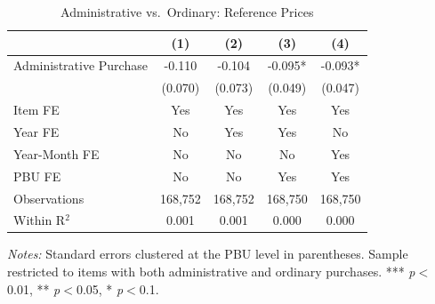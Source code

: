 \begin{table}[ht]
  \centering
  \caption{Administrative vs.\ Ordinary: Reference Prices}
  \label{tab:v8_adm_ref_prices}
  \small
  \begin{threeparttable}
  \begin{tabular}{lcccc}
    \hline\hline
    & (1) & (2) & (3) & (4) \\
    \hline
    Administrative Purchase & -0.110 & -0.104 & -0.095* & -0.093* \\
     & (0.070) & (0.073) & (0.049) & (0.047) \\[3pt]
    \hline
    Item FE & Yes & Yes & Yes & Yes \\
    Year FE & No & Yes & Yes & No \\
    Year-Month FE & No & No & No & Yes \\
    PBU FE & No & No & Yes & Yes \\
    Observations & 168,752 & 168,752 & 168,750 & 168,750 \\
    Within R$^2$ & 0.001 & 0.001 & 0.000 & 0.000 \\
    \hline\hline
  \end{tabular}
  \begin{tablenotes}
    \small
    \item \textit{Notes:} Standard errors clustered at the PBU level in parentheses. Sample restricted to items with both administrative and ordinary purchases. *** \textit{p}$<$0.01, ** \textit{p}$<$0.05, * \textit{p}$<$0.1.
  \end{tablenotes}
  \end{threeparttable}
\end{table}
